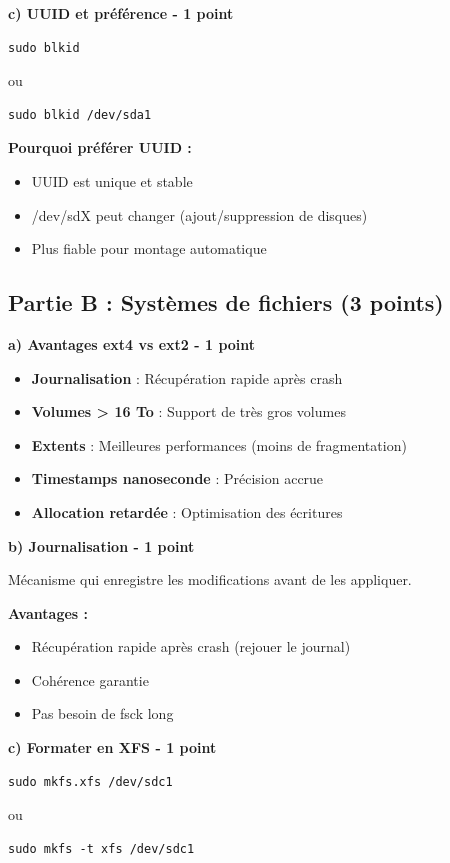\documentclass[12pt,a4paper]{article}
\begin{document}
\begin{answerbox}
\textbf{c) UUID et préférence - 1 point}
\begin{lstlisting}
sudo blkid
\end{lstlisting}

ou

\begin{lstlisting}
sudo blkid /dev/sda1
\end{lstlisting}

\textbf{Pourquoi préférer UUID :}
\begin{itemize}
    \item UUID est unique et stable
    \item /dev/sdX peut changer (ajout/suppression de disques)
    \item Plus fiable pour montage automatique
\end{itemize}
\end{answerbox}

\subsection*{Partie B : Systèmes de fichiers (3 points)}

\begin{answerbox}
\textbf{a) Avantages ext4 vs ext2 - 1 point}

\begin{itemize}
    \item \textbf{Journalisation} : Récupération rapide après crash
    \item \textbf{Volumes > 16 To} : Support de très gros volumes
    \item \textbf{Extents} : Meilleures performances (moins de fragmentation)
    \item \textbf{Timestamps nanoseconde} : Précision accrue
    \item \textbf{Allocation retardée} : Optimisation des écritures
\end{itemize}

\textbf{b) Journalisation - 1 point}

Mécanisme qui enregistre les modifications avant de les appliquer.

\textbf{Avantages :}
\begin{itemize}
    \item Récupération rapide après crash (rejouer le journal)
    \item Cohérence garantie
    \item Pas besoin de fsck long
\end{itemize}

\textbf{c) Formater en XFS - 1 point}
\begin{lstlisting}
sudo mkfs.xfs /dev/sdc1
\end{lstlisting}

ou

\begin{lstlisting}
sudo mkfs -t xfs /dev/sdc1
\end{lstlisting}
\end{answerbox}
\end{document}
